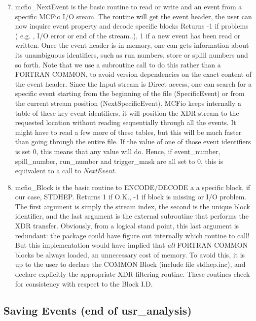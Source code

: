 \begin{enumerate}
\setcounter{enumi}{6}
\item  mcfio\_NextEvent is the basic routine to read or write and an event from
a specific MCFio I/O sream. The routine  will get the event header, the user can
now  inquire event property and decode specific blocks Returns -1 if problems (
e.g. , I/O error or end  of the stream..), 1 if a new event has been read or
written.  Once the event header is in memory, one can gets information  about
its unambiguous identifiers, such as run numbers, store or splill  numbers and
so forth. Note that we use a subroutine call to do this rather  than a FORTRAN
COMMON, to avoid version dependencies on the exact  content of the event
header.  Since the Input stream is Direct access,  one can search for a
specific event starting from the beginning of the  file (SpecificEvent) or from
the current stream position  (NextSpecificEvent). MCFio keeps internally
a table of these  key event identifiers, it will position the XDR  stream to
the requested location without reading  sequentially through all the events. It
might have  to read a few more of these tables, but this will  be much faster
than going through the entire file. If the value of one of those event 
identifiers is set 0, this means that any value will do. Hence, if 
event\_number, spill\_number, run\_number and trigger\_mask are all set to 
0, this is equivalent to a call to {\em NextEvent}. 

\item mcfio\_Block is the basic routine to ENCODE/DECODE a 
a specific block, if our case, STDHEP. Returns 1 if O.K., -1 if block 
is missing or I/O problem. The first argument is simply the stream index, 
the second is the unique block identifier, and the last argument is the 
external subroutine that performs the XDR transfer. Obviously, from a 
logical stand point, this last argument is redundant: the package could 
have figure out internally which routine to call! But this implementation
would have implied that {\em all } FORTRAN COMMON blocks be always 
loaded, an unnecessary cost of memory. To avoid this, it is up to the 
user to declare the COMMON Block (include file stdhep.inc), and declare 
explicitly the appropriate XDR filtering routine.  These routines
check for consistency with respect to the Block I.D.

\end{enumerate}

\subsection{Saving Events (end of usr\_analysis)}
\vspace{.1in}

